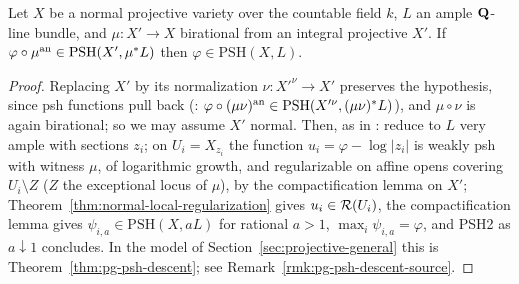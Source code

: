 \begin{corollary}\label{cor:normal-weak-global}
\leanok
{}
Let $X$ be a normal projective variety over the countable field $k$, $L$ an ample $\mathbf{Q}$-line bundle,
and $\mu\colon X'\to X$ birational from an integral projective $X'$. If $\varphi\circ\mu^{\mathrm{an}}\in
\mathrm{PSH}(X',\mu^*L)$ then $\varphi\in\mathrm{PSH}(X,L)$.
\end{corollary}

\begin{proof}
Replacing $X'$ by its normalization $\nu\colon X'^\nu\to X'$ preserves the hypothesis, since psh functions pull back
(\cite[Proposition~2.1(4)]{FHX}: $\varphi\circ(\mu\nu)^{\mathrm{an}}\in\mathrm{PSH}(X'^\nu,(\mu\nu)^*L)$), and $\mu\circ\nu$ is again
birational; so we may assume $X'$ normal. Then, as in \cite[Corollary~5.26]{FHX}: reduce to $L$ very ample with sections $z_i$; on $U_i=X_{z_i}$ the
function $u_i=\varphi-\log|z_i|$ is weakly psh with witness $\mu$, of logarithmic growth, and
regularizable on affine opens covering $U_i\setminus Z$ ($Z$ the exceptional locus of $\mu$), by the
compactification lemma on $X'$; Theorem~\ref{thm:normal-local-regularization} gives $u_i\in\mathcal{R}(U_i)$,
the compactification lemma gives $\psi_{i,a}\in\mathrm{PSH}(X,aL)$ for rational $a>1$, $\max_i\psi_{i,a}=\varphi$,
and PSH2 as $a\downarrow1$ concludes. In the model of Section~\ref{sec:projective-general} this is
Theorem~\ref{thm:pg-psh-descent}; see Remark~\ref{rmk:pg-psh-descent-source}.
\end{proof}
